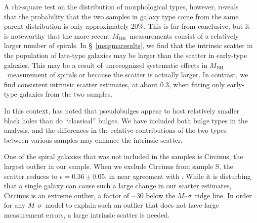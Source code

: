 \documentclass[twosided,letterpaper,numberedappendix]{emulateapj}
\newcommand{\msigma}   {\ensuremath{M}{--}\ensuremath{\sigma}}
\newcommand{\mbh}      {\ensuremath{M_{\mathrm{BH}}}}
\begin{document}
A chi-square test on the distribution of morphological types, however,
reveals that the probability that the two samples in galaxy type come
from the same parent distribution is only approximately 20\%.  This is
far from conclusive, but it is noteworthy that the more recent \mbh\
measurements consist of a relatively larger number of spirals.  In
\S~\ref{msigmaresults}, we find that the intrinsic scatter in the
population of late-type galaxies may be larger than the scatter in
early-type galaxies.  This may be a result of unrecognized systematic
effects in \mbh\ measurement of spirals or because the scatter is
actually larger.  In contrast, we find consistent intrinsic scatter
estimates, at about 0.3, when fitting only early-type galaxies from
the two samples.

In this context, \citet{hu08} has noted that pseudobulges appear to
host relatively smaller black holes than do ``classical'' bulges.  We
have included both bulge types in the analysis, and the differences in
the relative contributions of the two types between various samples
may enhance the intrinsic scatter.

One of the spiral galaxies that was not included in the
\citet{tremaineetal02} samples is Circinus, the largest outlier in our
sample.  When we exclude Circinus from sample S, the scatter reduces
to $\epsilon = 0.36 \pm 0.05$, in near agreement with
\citet{tremaineetal02}.  While it is disturbing that a single galaxy
can cause such a large change in our scatter estimates, Circinus is an
extreme outlier, a factor of $\sim30$ below the \msigma\ ridge line.
In order for any \msigma\ model to explain such an outlier that does
not have large measurement errors, a large intrinsic scatter is
needed.
\end{document}

